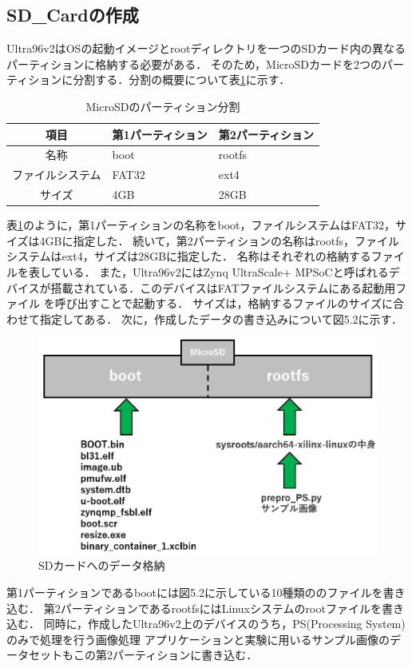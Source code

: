 \documentclass[11pt,a4j]{jreport}
\begin{document}
\subsection{SD_Cardの作成}
Ultra96v2はOSの起動イメージとrootディレクトリを一つのSDカード内の異なるパーティションに格納する必要がある．
そのため，MicroSDカードを2つのパーティションに分割する．分割の概要について表\ref{SDpartition}に示す．
\begin{table}[H]
  \caption{MicroSDのパーティション分割}
  \label{SDpartition}
  \centering
  \begin{tabular}{|c|l|l|}
    \hline
    項目 & 第1パーティション & 第2パーティション \\
    \hline \hline
    名称 & boot & rootfs \\
    ファイルシステム & FAT32 & ext4 \\
    サイズ & 4GB & 28GB \\
    \hline
    \end{tabular}
\end{table}
表\ref{SDpartition}のように，第1パーティションの名称をboot，ファイルシステムはFAT32，サイズは4GBに指定した．
続いて，第2パーティションの名称はrootfs，ファイルシステムはext4，サイズは28GBに指定した．
名称はそれぞれの格納するファイルを表している．
また，Ultra96v2にはZynq UltraScale+ MPSoCと呼ばれるデバイスが搭載されている．このデバイスはFATファイルシステムにある起動用ファイル
を呼び出すことで起動する．
サイズは，格納するファイルのサイズに合わせて指定してある．
次に，作成したデータの書き込みについて図5.2に示す．
\begin{figure}[H]
  \center
  \includegraphics[scale = 0.7]{pict/pict8.jpg}
  \caption{SDカードへのデータ格納}
\end{figure}
第1パーティションであるbootには図5.2に示している10種類ののファイルを書き込む．
第2パーティションであるrootfsにはLinuxシステムのrootファイルを書き込む．
同時に，作成したUltra96v2上のデバイスのうち，PS(Processing System)のみで処理を行う画像処理
アプリケーションと実験に用いるサンプル画像のデータセットもこの第2パーティションに書き込む．
\end{document}
